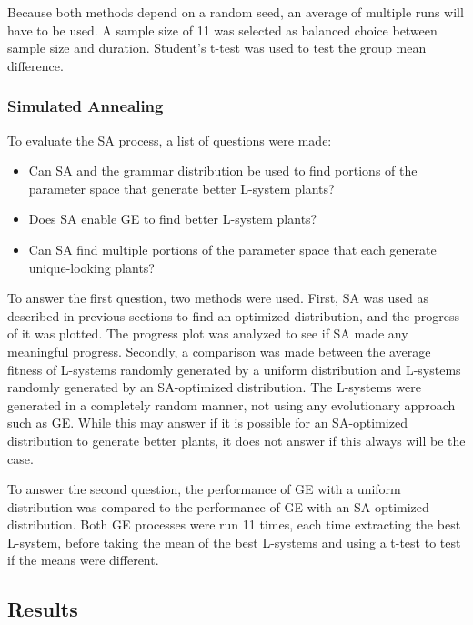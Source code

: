 Because both methods depend on a random seed, an average of multiple runs will have to be used.
A sample size of 11 was selected as balanced choice between sample size and duration.
Student's t-test was used to test the group mean difference.

\subsubsection{Simulated Annealing}
To evaluate the SA process, a list of questions were made:
\begin{itemize}
	\item Can SA and the grammar distribution be used to find portions of the parameter space that generate better L-system plants?
	\item Does SA enable GE to find better L-system plants?
	\item Can SA find multiple portions of the parameter space that each generate unique-looking plants?
\end{itemize}
To answer the first question, two methods were used.
First, SA was used as described in previous sections to find an optimized distribution, and the progress of it was plotted.
The progress plot was analyzed to see if SA made any meaningful progress.
Secondly, a comparison was made between the average fitness of L-systems randomly generated by a uniform distribution and L-systems randomly generated by an SA-optimized distribution.
The L-systems were generated in a completely random manner, not using any evolutionary approach such as GE.
While this may answer if it is possible for an SA-optimized distribution to generate better plants, it does not answer if this always will be the case.

To answer the second question, the performance of GE with a uniform distribution was compared to the performance of GE with an SA-optimized distribution.
Both GE processes were run 11 times, each time extracting the best L-system, before taking the mean of the best L-systems and using a t-test to test if the means were different.

\subsection{Results}
